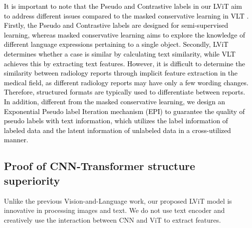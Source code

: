 \documentclass[lettersize,journal]{IEEEtran}
\begin{document}
\textcolor{black}{
It is important to note that the Pseudo and Contrastive labels in our LViT aim to address different issues compared to the masked conservative learning in VLT \cite{Ding22PAMI}. Firstly, the Pseudo and Contrastive labels are designed for semi-supervised learning, whereas masked conservative learning aims to explore the knowledge of different language expressions pertaining to a single object. Secondly, LViT determines whether a case is similar by calculating text similarity, while VLT achieves this by extracting text features. However, it is difficult to determine the similarity between radiology reports through implicit feature extraction in the medical field, as different radiology reports may have only a few wording changes. Therefore, structured formats are typically used to differentiate between reports. In addition, different from the masked conservative learning, we design an Exponential Pseudo label Iteration mechanism (EPI) to guarantee the quality of pseudo labels with text information, which utilizes the label information of labeled data and the latent information of unlabeled data in a cross-utilized manner.}

\subsection{Proof of CNN-Transformer structure superiority}
Unlike the previous Vision-and-Language work, our proposed LViT model is innovative in processing images and text. We do not use text encoder and creatively use the interaction between CNN and ViT to extract features.
\end{document}
